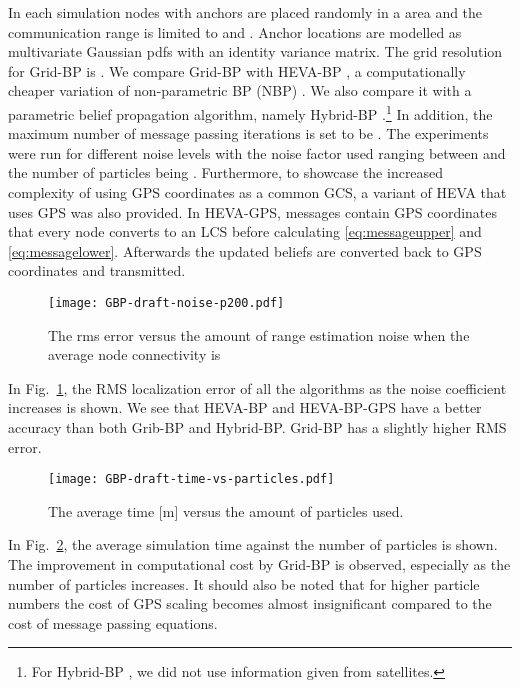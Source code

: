 \documentclass[10pt, final, journal]{IEEEtran}
\begin{document}
In each simulation  nodes with  anchors are placed randomly in a  area and the communication range is limited to  and . Anchor locations are modelled as multivariate Gaussian pdfs with an identity variance matrix. The grid resolution for Grid-BP is . We compare Grid-BP with HEVA-BP \cite{oikonomou2011hybrid}, a computationally cheaper variation of non-parametric BP (NBP) \cite{Ihler:2005be}. We also compare it with a parametric belief propagation algorithm, namely Hybrid-BP \cite{Caceres:2011wx}.\footnote{For Hybrid-BP \cite{Caceres:2011wx}, we did not use information given from satellites.} In addition, the maximum number of message passing iterations is set to be . The experiments were run for different noise levels with the noise factor used ranging between  and the number of particles being . Furthermore, to showcase the increased complexity of using GPS coordinates as a common GCS, a variant of HEVA that uses GPS was also provided. In HEVA-GPS, messages contain GPS coordinates that every node converts to an LCS before calculating \eqref{eq:messageupper} and \eqref{eq:messagelower}. Afterwards the updated beliefs are converted back to GPS coordinates and transmitted.

\begin{figure}[!ht]
  \centering
  \texttt{[image: GBP-draft-noise-p200.pdf]}
  \caption{The rms error versus the amount of range estimation noise  when the average node connectivity is }\label{fig:noise}
\end{figure}

In Fig.~\ref{fig:noise}, the RMS localization error of all the algorithms as the noise coefficient increases is shown. We see that HEVA-BP and HEVA-BP-GPS have a better accuracy than both Grib-BP and Hybrid-BP. Grid-BP has a slightly higher RMS error.

\begin{figure}[!ht]
  \centering
\texttt{[image: GBP-draft-time-vs-particles.pdf]}
\caption{The average time [m] versus the amount of particles used.}\label{fig:time}
\end{figure}

In Fig.~\ref{fig:time}, the average simulation time against the number of particles is shown. The improvement in computational cost by Grid-BP is observed, especially as the number of particles increases. It should also be noted that for higher particle numbers the cost of GPS scaling becomes almost insignificant compared to the cost of message passing equations.
\end{document}
